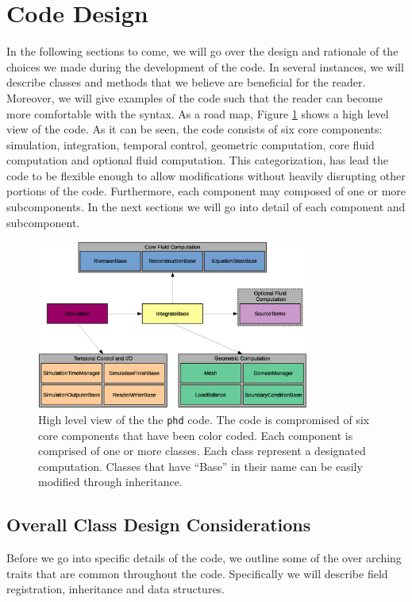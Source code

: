 \section{Code Design}
In the following sections to come, we will go over the design and rationale of the choices
we made during the development of the code. In several instances, we will describe 
classes and methods that we believe are beneficial for the reader. Moreover, we will
give examples of the code such that the reader can become more
comfortable with the syntax. As a road map, Figure \ref{fig.phd_design} shows a high level view of the code. As it can be seen, the code consists of six core components:
simulation, integration, temporal control, geometric computation, core fluid
computation and optional fluid computation. This categorization, has lead the code
to be flexible enough to allow modifications without heavily disrupting other
portions of the code. Furthermore, each component may composed of one or more
subcomponents. In the next sections we will go into detail of each component and subcomponent.
\begin{figure}
    \begin{center}
        \includegraphics[width=0.8\textwidth]{figures/phd_chart.eps}
        \caption{High level view of the the \texttt{phd} code. The code is compromised of six core components
        that have been color coded. Each component is comprised of one or more classes. Each class
        represent a designated computation. Classes that have ``Base'' in their
        name can be easily modified through inheritance.}
        \label{fig.phd_design}
    \end{center}
\end{figure}

\subsection{Overall Class Design Considerations}
Before we go into specific details of the code, we outline some of the over arching
traits that are common throughout the code. Specifically we will describe field registration,
inheritance and data structures.

